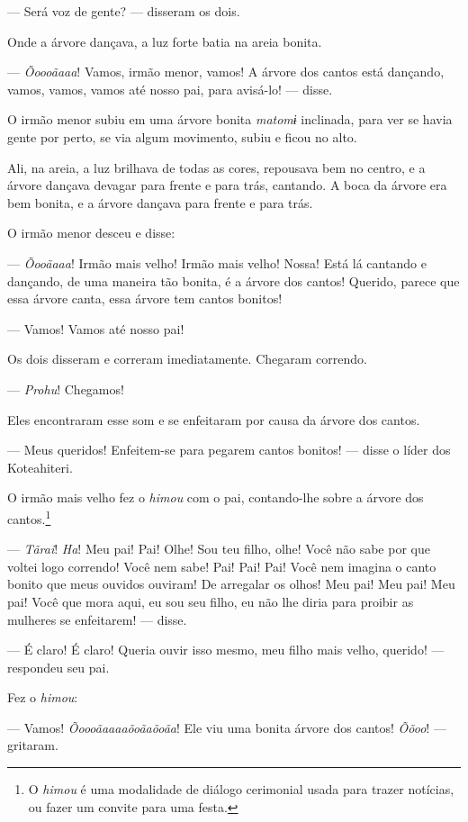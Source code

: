 --- Será voz de gente? --- disseram os dois. 

Onde a árvore dançava, a luz forte batia na areia bonita. 

--- \textit{Õoooãaaa}! Vamos, irmão menor, vamos! A árvore dos cantos está
dançando, vamos, vamos, vamos até nosso pai, para avisá-lo! --- disse. 

O irmão menor subiu em uma árvore bonita \textit{matomɨ} inclinada, para
ver se havia gente por perto, se via algum movimento, subiu e ficou
no alto. 

Ali, na areia, a luz brilhava de todas as cores, repousava bem no
centro, e a árvore dançava devagar para frente e para trás, cantando. A boca da árvore era bem bonita, e a árvore dançava para frente e para
trás. 

O irmão menor desceu e disse:

--- \textit{Õooãaaa}! Irmão mais velho! Irmão mais velho! Nossa! Está lá cantando
e dançando, de uma maneira tão bonita, é a árvore dos cantos! Querido,
parece que essa árvore canta, essa árvore tem cantos bonitos! 

--- Vamos! Vamos até nosso pai! 

Os dois disseram e correram imediatamente. Chegaram correndo.

--- \textit{Prohu}! Chegamos! 

Eles encontraram esse som e se enfeitaram por causa da árvore dos cantos. 

--- Meus queridos! Enfeitem-se para pegarem cantos bonitos! --- disse o
líder dos Koteahiteri. 

O irmão mais velho fez o \textit{himou} com o pai, contando-lhe sobre a
árvore dos cantos.\footnote{O \textit{himou} é uma modalidade de diálogo cerimonial usada para trazer notícias, ou fazer um convite para uma festa.}

--- \textit{Tãrai}! \textit{Ha}! Meu pai! Pai! Olhe! Sou teu filho, olhe! Você não sabe
por que voltei logo correndo! Você nem sabe! Pai! Pai! Pai! Você nem
imagina o canto bonito que meus ouvidos ouviram! De arregalar os olhos!
Meu pai! Meu pai! Meu pai! Você que mora aqui, eu sou seu filho, eu não
lhe diria para proibir as mulheres se enfeitarem! --- disse. 

--- É claro! É claro! Queria ouvir isso mesmo, meu filho mais velho,
querido! --- respondeu seu pai. 

Fez o \textit{himou}: 

--- Vamos! \textit{Õoooãaaaaõoãaõoãa}! Ele viu uma bonita árvore dos cantos!
\textit{Õõoo}! --- gritaram. 

